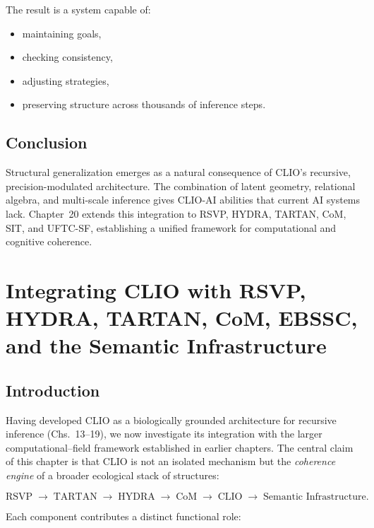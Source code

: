 \documentclass[12pt,oneside]{book}
\theoremstyle{plain}
\theoremstyle{definition}
\begin{document}
The result is a system capable of:

\begin{itemize}
    \item maintaining goals,
    \item checking consistency,
    \item adjusting strategies,
    \item preserving structure across thousands of inference steps.
\end{itemize}

\section{Conclusion}

Structural generalization emerges as a natural consequence of CLIO’s recursive,
precision-modulated architecture.
The combination of latent geometry, relational algebra, and multi-scale
inference gives CLIO-AI abilities that current AI systems lack.
Chapter~20 extends this integration to RSVP, HYDRA, TARTAN, CoM, SIT, and
UFTC-SF, establishing a unified framework for computational and cognitive
coherence.

\chapter{Integrating CLIO with RSVP, HYDRA, TARTAN, CoM, EBSSC, and the Semantic Infrastructure}

\section{Introduction}

Having developed CLIO as a biologically grounded architecture for recursive
inference (Chs.~13--19), we now investigate its integration with the larger
computational–field framework established in earlier chapters.  The central
claim of this chapter is that CLIO is not an isolated mechanism but the
\emph{coherence engine} of a broader ecological stack of structures:

\[
\text{RSVP} \;\longrightarrow\; \text{TARTAN} \;\longrightarrow\;
\text{HYDRA} \;\longrightarrow\; \text{CoM} \;\longrightarrow\; \text{CLIO}
\;\longrightarrow\; \text{Semantic Infrastructure}.
\]

Each component contributes a distinct functional role:
\end{document}
